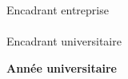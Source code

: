 \begin{titlepage}
\vspace{0.4cm}

\begin{center}
    Encadrant entreprise\\[0.2cm]
    \textbf{\companySupervisor}\\[0.4cm]
    Encadrant universitaire\\[0.2cm]
    \textbf{\schoolSupervisor}
\end{center}

\vspace{0.9cm}

\begin{center}
    \textbf{Année universitaire}\\[0.15cm]
    \academicYear
\end{center}

\end{titlepage}

